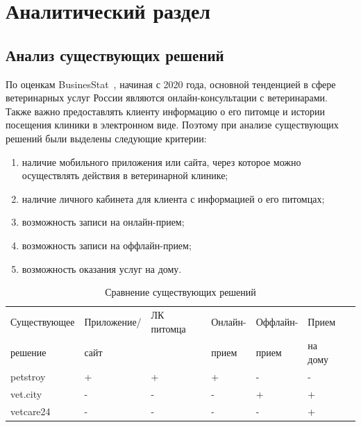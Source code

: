 \section{Аналитический раздел}

\subsection{Анализ существующих решений}

По оценкам BusinesStat~\cite{businesstat}, начиная с 2020 года, основной тенденцией в сфере ветеринарных услуг России являются онлайн-консультации с ветеринарами. Также важно предоставлять клиенту информацию о его питомце и истории посещения клиники в электронном виде. Поэтому при анализе существующих решений были выделены следующие критерии:
\begin{enumerate}[label*=---]
	\item наличие мобильного приложения или сайта, через которое можно осуществлять действия в ветеринарной клинике;
 	\item наличие личного кабинета для клиента с информацией о его питомцах;
 	\item возможность записи на онлайн-прием;
 	\item возможность записи на оффлайн-прием;
 	\item возможность оказания услуг на дому.
 \end{enumerate}

\begin{table}[hbtp]
	\begin{center}
		\begin{flushleft}
			\caption{\label{tab:solve}Сравнение существующих решений}
		\end{flushleft}
		\begin{tabular}{|l | l | l | l | l | l | l |} 
			\hline  Существующее &Приложение/ & ЛК питомца & Онлайн- & Оффлайн- & Прием   \\ 
			\noindent решение & сайт & ~ & прием & прием & на дому  \\ \hline
			
			petstroy~\cite{petstory} &   + &   + & + & - & - \\ \hline
			vet.city~\cite{vetcity} &   - &   - & - & + &   + \\ \hline
			vetcare24~\cite{vetcare24} &  - &   - & - & - & + \\ \hline
		\end{tabular}
	\end{center}
\end{table}

